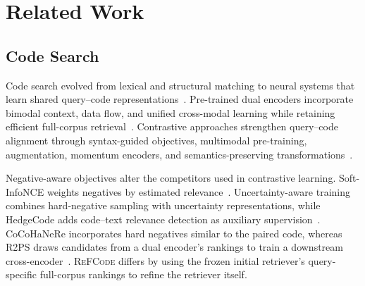 \documentclass[11pt]{article}
\newcommand{\method}{\textsc{ReFCode}}
\begin{document}
\section{Related Work}
\label{sec:related_work}

\subsection{Code Search}

Code search evolved from lexical and structural matching to neural systems that learn shared query--code representations~\citep{CodeHow,DeepCS}. Pre-trained dual encoders incorporate bimodal context, data flow, and unified cross-modal learning while retaining efficient full-corpus retrieval~\citep{CodeBERT,GraphCodeBERT,UniXcoder}. Contrastive approaches strengthen query--code alignment through syntax-guided objectives, multimodal pre-training, augmentation, momentum encoders, and semantics-preserving transformations~\citep{SynCoBERT,CodeRetriever,CoCoSoDa,Corder,ContraCode,ContraBERT}.

Negative-aware objectives alter the competitors used in contrastive learning. Soft-InfoNCE weights negatives by estimated relevance~\citep{SoftInfoNCE}. Uncertainty-aware training combines hard-negative sampling with uncertainty representations, while HedgeCode adds code--text relevance detection as auxiliary supervision~\citep{AAAIUA,HedgeCode}. CoCoHaNeRe incorporates hard negatives similar to the paired code, whereas R2PS draws candidates from a dual encoder's rankings to train a downstream cross-encoder~\citep{CoCoHaNeRe,R2PS}. \method{} differs by using the frozen initial retriever's query-specific full-corpus rankings to refine the retriever itself.
\end{document}
